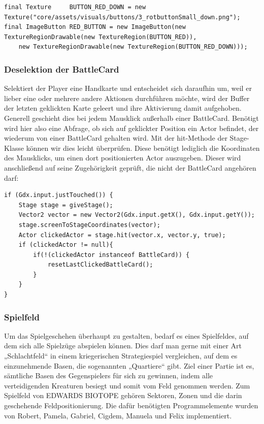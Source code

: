 \begin{lstlisting}[basicstyle=\tiny]
final Texture     BUTTON_RED_DOWN = new Texture("core/assets/visuals/buttons/3_rotbuttonSmall_down.png");
final ImageButton RED_BUTTON = new ImageButton(new TextureRegionDrawable(new TextureRegion(BUTTON_RED)), 
	new TextureRegionDrawable(new TextureRegion(BUTTON_RED_DOWN)));
\end{lstlisting}

\subsubsection{Deselektion der BattleCard}
Selektiert der Player eine Handkarte und entscheidet sich daraufhin um, weil er lieber eine oder mehrere andere Aktionen durchführen möchte, wird der Buffer der letzten geklickten Karte geleert und ihre Aktivierung damit aufgehoben. Generell geschieht dies bei jedem Mausklick außerhalb einer BattleCard.
Benötigt wird hier also eine Abfrage, ob sich auf geklickter Position ein Actor befindet, der wiederum von einer BattleCard gehalten wird.
Mit der hit-Methode der Stage-Klasse können wir dies leicht überprüfen. Diese benötigt lediglich die Koordinaten des Mausklicks, um einen dort positionierten Actor auszugeben. Dieser wird anschließend auf seine Zugehörigkeit geprüft, die nicht der BattleCard angehören darf:

\begin{lstlisting}
if (Gdx.input.justTouched()) {
	Stage stage = giveStage();
	Vector2 vector = new Vector2(Gdx.input.getX(), Gdx.input.getY());
	stage.screenToStageCoordinates(vector);
	Actor clickedActor = stage.hit(vector.x, vector.y, true);
	if (clickedActor != null){
		if(!(clickedActor instanceof BattleCard)) {
			resetLastClickedBattleCard();
		}
	}
}
\end{lstlisting}

\subsubsection{Spielfeld}
Um das Spielgeschehen überhaupt zu gestalten, bedarf es eines Spielfeldes, auf dem sich alle Spielzüge abspielen können.
Dies darf man gerne mit einer Art „Schlachtfeld“ in einem kriegerischen Strategiespiel vergleichen, auf dem es einzunehmende Basen, die sogenannten „Quartiere“ gibt. Ziel einer Partie ist es, sämtliche Basen des Gegenspielers für sich zu gewinnen, indem alle verteidigenden Kreaturen besiegt und somit vom Feld genommen werden.
Zum Spielfeld von EDWARDS BIOTOPE gehören Sektoren, Zonen und die darin geschehende Feldpositionierung. Die dafür benötigten Programmelemente wurden von Robert, Pamela, Gabriel, Cigdem, Manuela und Felix implementiert.

